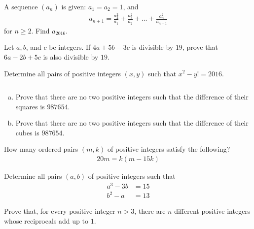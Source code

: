 \begin{problem}
	A sequence $(a_n)$ is given: $a_1=a_2=1$, and
	\begin{align*}
		a_{n+1} = \frac{a_2^2}{a_1} + \frac{a_3^2}{a_2} + \dots + \frac{a_n^2}{a_{n-1}}
	\end{align*}
	for $n\geq 2$. Find $a_{2016}$.
\end{problem}

\begin{problem}
	Let $a, b$, and $c$ be integers. If $4a+5b-3c$ is divisible by $19$, prove that $6a-2b+5c$ is also divisible by $19$.
\end{problem}

\begin{problem}
	Determine all pairs of positive integers $(x, y)$ such that $x^2 - y! = 2016$.
\end{problem}

\begin{problem}
	$ $
	\begin{enumerate}[(a)]
		\item Prove that there are no two positive integers such that the difference of their squares is $987654$.
		\item Prove that there are no two positive integers such that the difference of their cubes is $987654$.
	\end{enumerate}
\end{problem}

\begin{problem}
	How many ordered pairs $(m, k)$ of positive integers satisfy the following?
	\begin{align*}
		20m = k(m - 15k)
	\end{align*}
\end{problem}

\begin{problem}
	Determine all pairs $(a, b)$ of positive integers such that
	\begin{align*}
		a^3 - 3b &= 15\\
		b^2 - a  &= 13
	\end{align*}
\end{problem}

\begin{problem}
	Prove that, for every positive integer $n > 3$, there are $n$ different positive integers whose reciprocals add up to $1$.
\end{problem}

